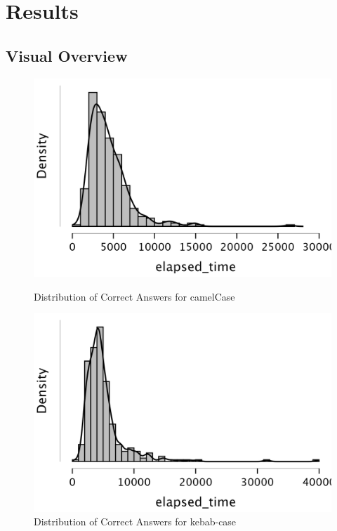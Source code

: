 \documentclass[unicode,11pt,a4paper,oneside,numbers=endperiod,openany]{scrartcl}
\begin{document}
\section{Results}
\subsection{Visual Overview}

\begin{figure}
    \centering
    \begin{minipage}{0.45\textwidth}
        \centering
        \includegraphics[width=\textwidth]{./figures/correct_camel_distr.png}
        \caption{Distribution of Correct Answers for camelCase}
        \label{fig:correct_camel_distr}
    \end{minipage}
    \hfill
    \begin{minipage}{0.45\textwidth}
        \centering
        \includegraphics[width=\textwidth]{./figures/correct_kebab_distr.png}
        \caption{Distribution of Correct Answers for kebab-case}
        \label{fig:correct_kebab_distr}
    \end{minipage}
\end{figure}
\end{document}
